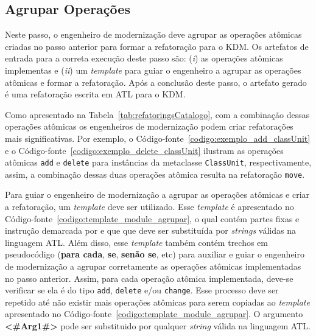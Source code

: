 \subsection{Agrupar Operações}

Neste passo, o engenheiro de modernização deve agrupar as operações atômicas criadas no passo anterior para formar a refatoração para o KDM. Os artefatos de entrada para a correta execução deste passo são: (\textit{i}) as operações atômicas implementas e (\textit{ii}) um \textit{template} para guiar o engenheiro a agrupar as operações atômicas e formar a refatoração. Após a conclusão deste passo, o artefato gerado é uma refatoração escrita em ATL para o KDM.

Como apresentado na Tabela~\ref{tab:refatoringsCatalogo}, com a combinação dessas operações atômicas os engenheiros de modernização podem criar refatorações mais significativas. Por exemplo, o Código-fonte~\ref{codigo:exemplo_add_classUnit} e o Código-fonte~\ref{codigo:exemplo_delete_classUnit} ilustram as operações atômicas \texttt{add} e \texttt{delete} para instâncias da metaclasse \texttt{ClassUnit}, respectivamente, assim, a combinação dessas duas operações atômica resulta na refatoração \texttt{move}. %

Para guiar o engenheiro de modernização a agrupar as operações atômicas e criar a refatoração, um \textit{template} deve ser utilizado. Esse \textit{template} é apresentado no Código-fonte~\ref{codigo:template_module_agrupar}, o qual contém partes fixas e instrução demarcada por \aspas{\textbf{<\#}} e \aspas{\textbf{\#>}} que que deve ser substituída por \textit{strings} válidas na linguagem ATL. Além disso, esse \textit{template} também contém trechos em pseudocódigo (\textbf{para cada}, \textbf{se}, \textbf{senão se}, etc) para auxiliar e guiar o engenheiro de modernização a agrupar corretamente as operações atômicas implementadas no passo anterior. Assim, para cada operação atômica implementada, deve-se verificar se ela é do tipo \texttt{add}, \texttt{delete} e/ou \texttt{change}. Esse processo deve ser repetido até não existir mais operações atômicas para serem copiadas ao \textit{template} apresentado no Código-fonte~\ref{codigo:template_module_agrupar}. O argumento \textbf{<\#Arg1\#>} pode ser substituido por qualquer \textit{string} válida na linguagem ATL.

